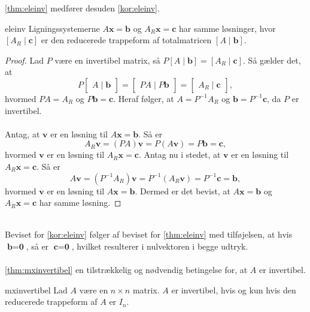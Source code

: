 %
\newpage
\noindent
%
\ref{thm:eleinv} medfører desuden \ref{kor:eleinv}.
% 
\begin{kor}{}{eleinv}
Ligningssystemerne $A\textbf{x}=\textbf{b}$ og $A_R\textbf{x}=\textbf{c}$ har samme løsninger, hvor 
$[A_R \mid \textbf{c}]$
er den reducerede trappeform af totalmatricen
$[A \mid\textbf{b}].$
\end{kor}\noindent
%
\begin{proof}
Lad $P$ være en invertibel matrix, så 
$P[A \mid\textbf{b}]
=
[A_R \mid \textbf{c}]
$.
Så gælder det, at 
$$ 
P
\begin{bmatrix}
A \mid \textbf{b}
\end{bmatrix}
=
\begin{bmatrix}
PA \mid P\textbf{b}
\end{bmatrix}
=
\begin{bmatrix}
A_R \mid \textbf{c}
\end{bmatrix},
$$
hvormed $PA=A_R$ og $P\textbf{b}=\textbf{c}$.
Heraf følger, at $A=P^{-1}A_R$ og $\textbf{b}=P^{-1}\textbf{c}$, da $P$ er invertibel. 
\\\\
Antag, at $\textbf{v}$ er en løsning til $A\textbf{x}=\textbf{b}$. Så er
$$
A_R\textbf{v}=(PA)\textbf{v}=P(A\textbf{v})=P\textbf{b}=\textbf{c},
$$
hvormed $\textbf{v}$ er en løsning til $A_R\textbf{x}=\textbf{c}$. 
Antag nu i stedet, at $\textbf{v}$ er en løsning til $A_R\textbf{x}=\textbf{c}$. Så er
$$
A\textbf{v}=(P^{-1}A_R)\textbf{v}=P^{-1}(A_R\textbf{v})=P^{-1}\textbf{c}=\textbf{b},
$$
hvormed $\textbf{v}$ er en løsning til $A\textbf{x}=\textbf{b}$. 
Dermed er det bevist, at $A\textbf{x}=\textbf{b}$ og $A_R\textbf{x}=\textbf{c}$ har samme løsning.

\end{proof}
\\
Beviset for \ref{kor:eleinv} følger af beviset for \ref{thm:eleinv} med tilføjelsen, at hvis $\textbf{b}=\textbf{0}$, så er $\textbf{c}=\textbf{0}$, hvilket resulterer i nulvektoren i begge udtryk.\\\\
%
\ref{thm:mxinvertibel}  en tilstrækkelig og nødvendig betingelse for, at $A$ er invertibel.
%
\begin{thm}{}{mxinvertibel}
Lad $A$ være en $n \times n$ matrix. 
$A$ er invertibel, hvis og kun hvis den reducerede trappeform af $A$ er $I_n$.
\end{thm}
%
